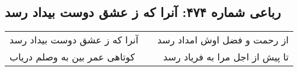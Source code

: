 \begin{center}
\section*{رباعی شماره ۴۷۴: آنرا که ز عشق دوست بیداد رسد}
\label{sec:0474}
\begin{longtable}{l p{0.5cm} r}
آنرا که ز عشق دوست بیداد رسد
&&
از رحمت و فضل اوش امداد رسد
\\
کوتاهی عمر بین به وصلم دریاب
&&
تا پیش از اجل مرا به فریاد رسد
\\
\end{longtable}
\end{center}
